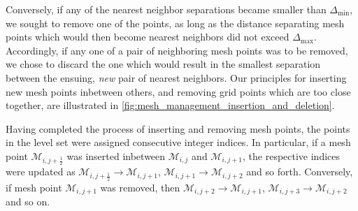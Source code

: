 Conversely, if any of the nearest neighbor separations became smaller than
$\Delta_{\min}$, we sought to remove one of the points, as long as the
distance separating mesh points which would then become nearest neighbors
did not exceed $\Delta_{\max}$. Accordingly, if any one of a pair of
neighboring mesh points was to be removed, we chose to discard the one which
would result in the smallest separation between the ensuing, \emph{new} pair of
nearest neighbors. Our principles for inserting new mesh points inbetween
others, and removing grid points which are too close together, are illustrated
in \cref{fig:mesh_management_insertion_and_deletion}.



Having completed the process of inserting and removing mesh points, the
points in the level set were assigned consecutive integer indices. In
particular, if a mesh point $\mathcal{M}_{i,j+\frac{1}{2}}$ was inserted
inbetween $\mathcal{M}_{i,j}$ and $\mathcal{M}_{i,j+1}$, the respective indices
were updated as $\mathcal{M}_{i,j+\frac{1}{2}}\to\mathcal{M}_{i,j+1}$,
$\mathcal{M}_{i,j+1}\to\mathcal{M}_{i,j+2}$ and so forth. Conversely, if mesh
point $\mathcal{M}_{i,j+1}$ was removed, then
$\mathcal{M}_{i,j+2}\to\mathcal{M}_{i,j+1}$,
$\mathcal{M}_{i,j+3}\to\mathcal{M}_{i,j+2}$ and so on.
